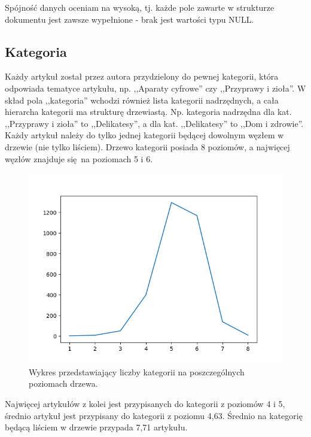 \documentclass[pl]{minipw} %
\begin{document}
Spójność danych oceniam na wysoką, tj. każde pole zawarte w strukturze dokumentu jest zawsze wypełnione - brak jest wartości typu NULL.

\subsection{Kategoria}

Każdy artykuł został przez autora przydzielony do pewnej kategorii, która odpowiada tematyce artykułu, np. ,,Aparaty cyfrowe'' czy ,,Przyprawy i zioła''. W skład pola ,,kategoria'' wchodzi również lista kategorii nadrzędnych, a cała hierarcha kategorii ma strukturę drzewiastą. Np. kategoria nadrzędna dla kat. ,,Przyprawy i zioła'' to ,,Delikatesy'', a dla kat. ,,Delikatesy'' to  ,,Dom i zdrowie''. Każdy artykuł należy do tylko jednej kategorii będącej dowolnym węzłem w drzewie (nie tylko liściem). Drzewo kategorii posiada 8 poziomów, a najwięcej węzłów znajduje się na poziomach 5 i 6. 
\begin{figure}[H]
	\centering
	\includegraphics[width=1\textwidth]{img/categories_levels.png}
	\caption{Wykres przedstawiający liczby kategorii na poszczególnych poziomach drzewa.}
\end{figure}
Najwięcej artykułów z kolei jest przypisanych do kategorii z poziomów 4 i 5, średnio artykuł jest przypisany do kategorii z poziomu 4,63. Średnio na kategorię będącą liściem w drzewie przypada 7,71 artykułu.
\end{document}
